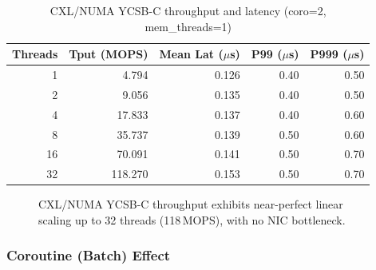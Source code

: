 \documentclass[11pt,a4paper]{article}
\begin{document}
\begin{table}[H]
\centering
\caption{CXL/NUMA YCSB-C throughput and latency (coro=2, mem\_threads=1)}
\label{tab:numa-ycsbc}
\begin{tabular}{@{}rrrrr@{}}
\toprule
\textbf{Threads} & \textbf{Tput (MOPS)} & \textbf{Mean Lat ($\mu$s)} & \textbf{P99 ($\mu$s)} & \textbf{P999 ($\mu$s)} \\
\midrule
1  & 4.794  & 0.126 & 0.40 & 0.50 \\
2  & 9.056  & 0.135 & 0.40 & 0.50 \\
4  & 17.833 & 0.137 & 0.40 & 0.60 \\
8  & 35.737 & 0.139 & 0.50 & 0.60 \\
16 & 70.091 & 0.141 & 0.50 & 0.70 \\
32 & 118.270 & 0.153 & 0.50 & 0.70 \\
\bottomrule
\end{tabular}
\end{table}

\begin{figure}[H]
\centering
{}
\caption{CXL/NUMA YCSB-C throughput exhibits near-perfect linear scaling up to 32 threads (118\,MOPS), with no NIC bottleneck.}
\label{fig:numa-ycsbc-bar}
\end{figure}

\subsubsection{Coroutine (Batch) Effect}
\end{document}
